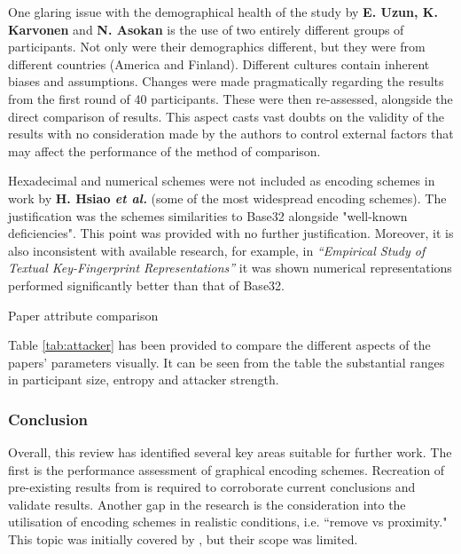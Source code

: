 One glaring issue with the demographical health of the study by \textbf{E. Uzun, K. Karvonen} and \textbf{N. Asokan}\cite{uzun2007usability} is the use of two entirely different groups of participants. Not only were their demographics different, but they were from different countries (America and Finland). Different cultures contain inherent biases and assumptions. Changes were made pragmatically regarding the results from the first round of 40 participants. These were then re-assessed, alongside the direct comparison of results. This aspect casts vast doubts on the validity of the results with no consideration made by the authors to control external factors that may affect the performance of the method of comparison.

Hexadecimal and numerical schemes were not included as encoding schemes in work by \textbf{H. Hsiao \textit{et al.}}\cite{hsiao2009study} (some of the most widespread encoding schemes). The justification was the schemes similarities to Base32  alongside "well-known deficiencies". This point was provided with no further justification. Moreover, it is also inconsistent with available research, for example, in \textit{``Empirical Study of Textual Key-Fingerprint Representations''}\cite{dechand2016empirical} it was shown numerical representations performed significantly better than that of Base32.

\begin{table}[h!]
    \centering
    \resizebox{.8\textwidth}{!}{%
        \makebox[\textwidth][c]{
            
        }%
    }
    \caption{Paper attribute comparison}
    \label{tab:attacker}
\end{table}

Table \ref{tab:attacker} has been provided to compare the different aspects of the papers' parameters visually. It can be seen from the table the substantial ranges in participant size, entropy and attacker strength.

\subsubsection*{Conclusion}
Overall, this review has identified several key areas suitable for further work.
The first is the performance assessment of graphical encoding schemes. Recreation of pre-existing results from \cite{hsiao2009study}\cite{tan2017can} is required to corroborate current conclusions and validate results.
Another gap in the research is the consideration into the utilisation of encoding schemes in realistic conditions, i.e. ``remove vs proximity." This topic was initially covered by \cite{shirvanian2017pitfalls}, but their scope was limited. 


